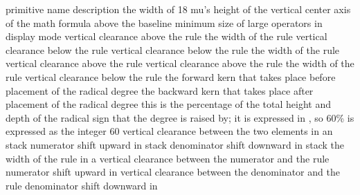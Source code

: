 \starttabulate
\FL
\BC primitive name                 \BC description \NC \NR
\TL
\NC \type {\Umathquad}               \NC the width of 18 mu's \NC \NR
\NC \type {\Umathaxis}               \NC height of the vertical center axis of
                                       the math formula above the baseline \NC \NR
\NC \type {\Umathoperatorsize}       \NC minimum size of large operators in display mode \NC \NR
\NC \type {\Umathoverbarkern}        \NC vertical clearance above the rule \NC \NR
\NC \type {\Umathoverbarrule}        \NC the width of the rule \NC \NR
\NC \type {\Umathoverbarvgap}        \NC vertical clearance below the rule \NC \NR
\NC \type {\Umathunderbarkern}       \NC vertical clearance below the rule \NC \NR
\NC \type {\Umathunderbarrule}       \NC the width of the rule \NC \NR
\NC \type {\Umathunderbarvgap}       \NC vertical clearance above the rule \NC \NR
\NC \type {\Umathradicalkern}        \NC vertical clearance above the rule \NC \NR
\NC \type {\Umathradicalrule}        \NC the width of the rule \NC \NR
\NC \type {\Umathradicalvgap}        \NC vertical clearance below the rule \NC \NR
\NC \type {\Umathradicaldegreebefore}\NC the forward kern that takes place before placement of
                                       the radical degree \NC \NR
\NC \type {\Umathradicaldegreeafter} \NC the backward kern that takes place after placement of
                                       the radical degree \NC \NR
\NC \type {\Umathradicaldegreeraise} \NC this is the percentage of the total height and depth of
                                       the radical sign that the degree is raised by; it is
                                       expressed in , so 60\% is expressed as the
                                       integer $60$ \NC \NR
\NC \type {\Umathstackvgap}          \NC vertical clearance between the two
                                       elements in an \type {\atop} stack \NC \NR
\NC \type {\Umathstacknumup}         \NC numerator shift upward in \type {\atop} stack \NC \NR
\NC \type {\Umathstackdenomdown}     \NC denominator shift downward in \type {\atop} stack \NC \NR
\NC \type {\Umathfractionrule}       \NC the width of the rule in a \type {\over} \NC \NR
\NC \type {\Umathfractionnumvgap}    \NC vertical clearance between the numerator and the rule \NC \NR
\NC \type {\Umathfractionnumup}      \NC numerator shift upward in \type {\over} \NC \NR
\NC \type {\Umathfractiondenomvgap}  \NC vertical clearance between the denominator and the rule \NC \NR
\NC \type {\Umathfractiondenomdown}  \NC denominator shift downward in \type {\over} \NC \NR
